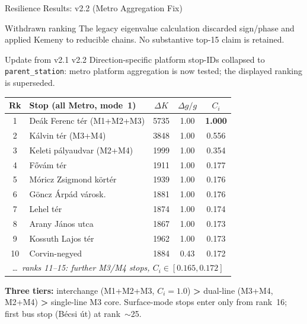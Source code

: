 \documentclass[aspectratio=169,12pt]{beamer}
\begin{document}
\begin{frame}{Resilience Results: v2.2 (Metro Aggregation Fix)}
\begin{alertblock}{Withdrawn ranking}
The legacy eigenvalue calculation discarded sign/phase and applied Kemeny to
reducible chains. No substantive top-15 claim is retained.
\end{alertblock}
\begin{alertblock}{Update from v2.1 \textrightarrow{} v2.2}
Direction-specific platform stop-IDs collapsed to \texttt{parent\_station}:
metro platform aggregation is now tested; the displayed ranking is superseded.
\end{alertblock}

\vspace{2pt}
\begin{center}
\scriptsize
\begin{tabular}{clccc}
\toprule
Rk & Stop (all Metro, mode~1) & $\Delta K$ & $\Delta g/g$ & $C_i$ \\
\midrule
1  & De\'ak Ferenc t\'er (M1+M2+M3)        & 5735 & 1.00 & \textbf{1.000} \\
2  & K\'alvin t\'er (M3+M4)                & 3848 & 1.00 & 0.556 \\
3  & Keleti p\'alyaudvar (M2+M4)           & 1999 & 1.00 & 0.354 \\
\midrule
4  & F\H{o}v\'am t\'er                     & 1911 & 1.00 & 0.177 \\
5  & M\'oricz Zsigmond k\"ort\'er          & 1939 & 1.00 & 0.176 \\
6  & G\"oncz \'Arp\'ad v\'arosk.           & 1881 & 1.00 & 0.176 \\
7  & Lehel t\'er                           & 1874 & 1.00 & 0.174 \\
8  & Arany J\'anos utca                    & 1867 & 1.00 & 0.173 \\
9  & Kossuth Lajos t\'er                   & 1962 & 1.00 & 0.173 \\
10 & Corvin-negyed                          & 1884 & 0.43 & 0.172 \\
\multicolumn{5}{c}{\textit{\ldots~ranks 11--15: further M3/M4 stops, $C_i\in[0.165,0.172]$}} \\
\bottomrule
\end{tabular}
\end{center}
\vspace{1pt}
\footnotesize
\textbf{Three tiers:} interchange (M1+M2+M3, $C_i\!=\!1.0$) \textbf{\textgreater{}}
dual-line (M3+M4, M2+M4) \textbf{\textgreater{}} single-line M3 core.
Surface-mode stops enter only from rank~16; first bus stop (B\'ecsi \'ut) at rank~$\sim$25.
\end{frame}
\end{document}
